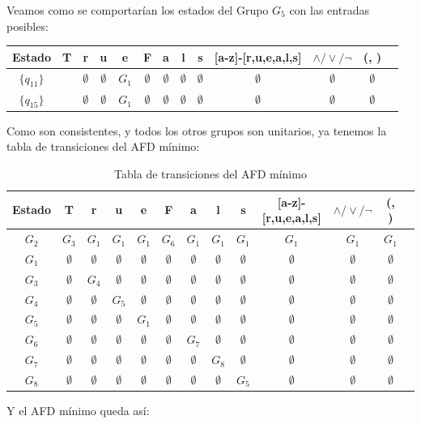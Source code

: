 Veamos como se comportarían los estados del Grupo $G_5$ con las entradas posibles:

\begin{table}[h!]
\centering
\begin{tabular}{|c|c|c|c|c|c|c|c|c|c|c|c|c|}
\hline
Estado &T & r & u & e & F & a & l &s &[a-z]-[r,u,e,a,l,s] &$\land/\lor/\lnot$ & (, )\\ \hline
\hline
$\{q_{11}\}$ & &  $\emptyset$& $\emptyset$ &  $G_1$& $\emptyset$  & $\emptyset$ & $\emptyset$ & $\emptyset$ & $\emptyset$ & $\emptyset$ & $\emptyset$\\ \hline
$\{q_{15}\}$ & &  $\emptyset$& $\emptyset$ & $G_1$ & $\emptyset$  & $\emptyset$ & $\emptyset$ & $\emptyset$ & $\emptyset$ & $\emptyset$ & $\emptyset$\\ \hline
\end{tabular}
\end{table}

Como son consistentes, y todos los otros grupos son unitarios, ya tenemos la tabla de transiciones del AFD mínimo:

\begin{table}[h!]
\centering
\begin{tabular}{|c|c|c|c|c|c|c|c|c|c|c|c|c|}
\hline
Estado &T & r & u & e & F & a & l &s &[a-z]-[r,u,e,a,l,s] &$\land/\lor/\lnot$ & (, )\\ \hline
\hline
$G_2$ & $ G_3$ & $ G_1$ & $G_1$ & $G_1$ & $G_6$ & $G_1$ & $G_1$ & $G_1$ & $G_1$ & $G_1$ & $G_1$\\ \hline
$G_1$ & $\emptyset$ & $\emptyset$ & $\emptyset$ & $\emptyset$ & $\emptyset$ & $\emptyset$ & $\emptyset$ & $\emptyset $ & $\emptyset$ & $\emptyset$ & $\emptyset$\\ \hline
$G_3$ & $\emptyset$ & $G_4$ & $\emptyset$ & $\emptyset$ & $\emptyset$  & $\emptyset$ & $\emptyset$ & $\emptyset$ & $\emptyset$ & $\emptyset$ & $\emptyset$\\ \hline
$G_4$ & $\emptyset$ &  $\emptyset$&  $G_5$& $\emptyset$ & $\emptyset$  & $\emptyset$ & $\emptyset$ & $\emptyset$ & $\emptyset$ & $\emptyset$ & $\emptyset$\\ \hline
$G_5$ & $\emptyset$ &  $\emptyset$& $\emptyset$ &  $G_1$& $\emptyset$  & $\emptyset$ & $\emptyset$ & $\emptyset$ & $\emptyset$ & $\emptyset$ & $\emptyset$\\ \hline
$G_6$ & $\emptyset$ & $\emptyset$ & $\emptyset$ & $\emptyset$  & $\emptyset$  & $G_7$ & $\emptyset$ & $\emptyset$& $\emptyset$ & $\emptyset$ & $\emptyset$\\ \hline
$G_7$ & $\emptyset$ &  $\emptyset$& $\emptyset$ & $\emptyset$ & $\emptyset$  & $\emptyset$ & $G_8$ & $\emptyset$ & $\emptyset$ & $\emptyset$ & $\emptyset$\\ \hline
$G_8$ & $\emptyset$ &  $\emptyset$& $\emptyset$ & $\emptyset$ & $\emptyset$  & $\emptyset$ & $\emptyset$ & $G_5$ & $\emptyset$ & $\emptyset$ & $\emptyset$\\ \hline
\end{tabular}
\caption{Tabla de transiciones del AFD mínimo}
\end{table}

Y el AFD mínimo queda así:

